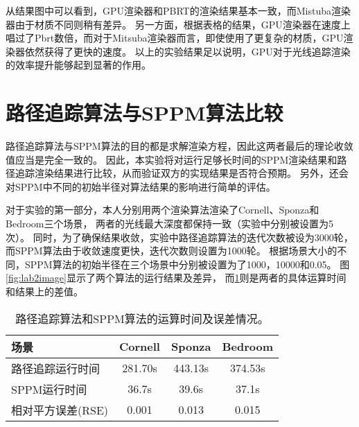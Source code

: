 从结果图中可以看到，GPU渲染器和PBRT的渲染结果基本一致，而Mistuba渲染器由于材质不同则稍有差异。
另一方面，根据表格的结果，GPU渲染器在速度上唱过了Pbrt数倍，而对于Mitsuba渲染器而言，即使使用了更复杂的材质，GPU渲染器依然获得了更快的速度。
以上的实验结果足以说明，GPU对于光线追踪渲染的效率提升能够起到显著的作用。

\section{路径追踪算法与SPPM算法比较}

路径追踪算法与SPPM算法的目的都是求解渲染方程，因此这两者最后的理论收敛值应当是完全一致的。
因此，本实验将对运行足够长时间的SPPM渲染结果和路径追踪渲染结果进行比较，从而验证双方的实现结果是否符合预期。
另外，还会对SPPM中不同的初始半径对算法结果的影响进行简单的评估。

对于实验的第一部分，本人分别用两个渲染算法渲染了Cornell、Sponza和Bedroom三个场景，
两者的光线最大深度都保持一致（实验中分别被设置为5次）。
同时，为了确保结果收敛，实验中路径追踪算法的迭代次数被设为3000轮，
而SPPM算法由于收敛速度更快，迭代次数则设置为1000轮。
根据场景大小的不同，SPPM算法的初始半径在三个场景中分别被设置为了1000，10000和0.05。
图\ref{fig:lab2image}显示了两个算法的运行结果及差异，
而\ref{tab:lab2time}则是两者的具体运算时间和结果上的差值。

\begin{table}[]
    \centering
    \begin{tabular}{@{}lccc@{}}
    \toprule
    场景     &  Cornell & Sponza & Bedroom \\ \midrule
    路径追踪运行时间 &   281.70s   &   443.13s   &  374.53s  \\
    SPPM运行时间 &   36.7s   &   39.6s  &  37.1s  \\
    相对平方误差(RSE) &   0.001   &   0.013   &  0.015  \\
    \bottomrule
    \end{tabular}
    \vspace{2mm}
    \caption{路径追踪算法和SPPM算法的运算时间及误差情况。}
    \label{tab:lab2time}
\end{table}

